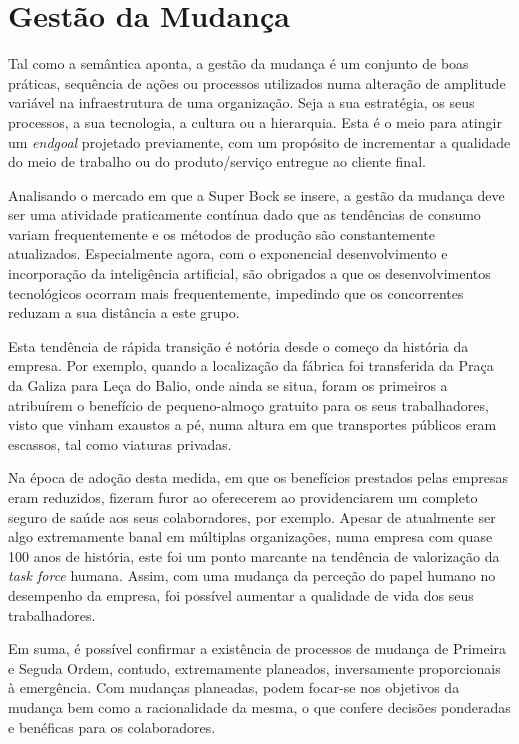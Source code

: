 \section{Gestão da Mudança}
Tal como a semântica aponta, a gestão da mudança é um conjunto de boas práticas, sequência de ações ou processos utilizados numa alteração de amplitude variável na infraestrutura de uma organização. Seja a sua estratégia, os seus processos, a sua tecnologia, a cultura ou a hierarquia. Esta é o meio para atingir um \textit{endgoal} projetado previamente, com um propósito de incrementar a qualidade do meio de trabalho ou do produto/serviço entregue ao cliente final. 

Analisando o mercado em que a Super Bock se insere, a gestão da mudança deve ser uma atividade praticamente contínua dado que as tendências de consumo variam frequentemente e os métodos de produção são constantemente atualizados. Especialmente agora, com o exponencial desenvolvimento e incorporação da inteligência artificial, são obrigados a que os desenvolvimentos tecnológicos ocorram mais frequentemente, impedindo que os concorrentes reduzam a sua distância a este grupo. 

Esta tendência de rápida transição é notória desde o começo da história da empresa. Por exemplo, quando a localização da fábrica foi transferida da Praça da Galiza para Leça do Balio, onde ainda se situa, foram os primeiros a atribuírem o benefício de pequeno-almoço gratuito para os seus trabalhadores, visto que vinham exaustos a pé, numa altura em que transportes públicos eram escassos, tal como viaturas privadas.  

Na época de adoção desta medida, em que os benefícios prestados pelas empresas eram reduzidos, fizeram furor ao oferecerem ao providenciarem um completo seguro de saúde aos seus colaboradores, por exemplo. Apesar de atualmente ser algo extremamente banal em múltiplas organizações, numa empresa com quase 100 anos de história, este foi um ponto marcante na tendência de valorização da \textit{task force} humana. Assim, com uma mudança da perceção do papel humano no desempenho da empresa, foi possível aumentar a qualidade de vida dos seus trabalhadores. 

Em suma, é possível confirmar a existência de processos de mudança de Primeira e Seguda Ordem, contudo, extremamente planeados, inversamente proporcionais à emergência. Com mudanças planeadas, podem focar-se nos objetivos da mudança bem como a racionalidade da mesma, o que confere decisões ponderadas e benéficas para os colaboradores. 

